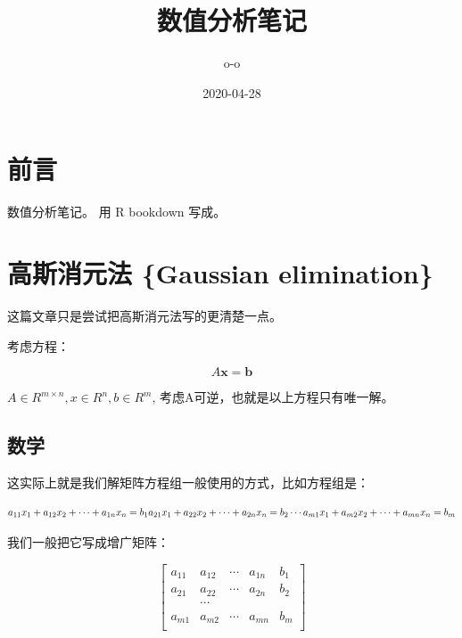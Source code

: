 \documentclass[
]{book}
\title{数值分析笔记}
\author{o-o}
\date{2020-04-28}
\begin{document}
\maketitle

{
\setcounter{tocdepth}{1}
\tableofcontents
}
\hypertarget{ux524dux8a00}{%
\chapter*{前言}\label{ux524dux8a00}}

数值分析笔记。
用 R bookdown 写成。

\hypertarget{ux9ad8ux65afux6d88ux5143ux6cd5-gaussian-elimination}{%
\chapter{高斯消元法 \{Gaussian elimination\}}\label{ux9ad8ux65afux6d88ux5143ux6cd5-gaussian-elimination}}

这篇文章只是尝试把高斯消元法写的更清楚一点。

考虑方程：

\[
A \mathbf{x} = \mathbf{b}
\]

\(A \in R^{m \times n}, x \in R^n, b \in R^m\), 考虑A可逆，也就是以上方程只有唯一解。

\hypertarget{ux6570ux5b66}{%
\section{数学}\label{ux6570ux5b66}}

这实际上就是我们解矩阵方程组一般使用的方式，比如方程组是：

\[
a_{11}x_1 + a_{12}x_2 + \cdots + a_{1n}x_n = b_1 \\
a_{21}x_1 + a_{22}x_2 + \cdots + a_{2n}x_n = b_2 \\
\cdots \\
a_{m1}x_1 + a_{m2}x_2 + \cdots + a_{mn}x_n = b_m \\
\]

我们一般把它写成增广矩阵：

\[
\begin{bmatrix}
a_{11} & a_{12} &  \cdots &  a_{1n} & b_1 \\
a_{21} & a_{22} &  \cdots &  a_{2n} & b_2 \\
       &      \cdots    &      \\   
a_{m1} & a_{m2} &  \cdots &  a_{mn} & b_m \\
\end{bmatrix}
\]
\end{document}
